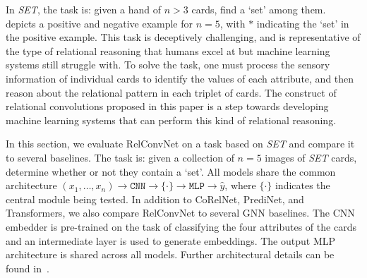 
In \textit{SET}, the task is: given a hand of $n > 3$ cards, find a `set' among them.~ depicts a positive and negative example for $n=5$, with $*$ indicating the `set' in the positive example.
This task is deceptively challenging, and is representative of the type of relational reasoning that humans excel at but machine learning systems still struggle with. To solve the task, one must process the sensory information of individual cards to identify the values of each attribute, and then reason about the relational pattern in each triplet of cards.
The construct of relational convolutions proposed in this paper is a step towards developing machine learning systems that can perform this kind of relational reasoning.


In this section, we evaluate RelConvNet on a task based on \textit{SET} and compare it to several baselines. The task is: given a collection of $n=5$ images of \textit{SET} cards, determine whether or not they contain a `set'. All models share the common architecture $(x_1, \ldots, x_n) \to \texttt{CNN} \to \{ \cdot \} \to \texttt{MLP} \to \hat{y}$, where $\{\cdot\}$ indicates the central module being tested. In addition to CoRelNet, PrediNet, and Transformers, we also compare RelConvNet to several GNN baselines. The CNN embedder is pre-trained on the task of classifying the four attributes of the cards and an intermediate layer is used to generate embeddings. The output MLP architecture is shared across all models.
Further architectural details can be found in~. 

